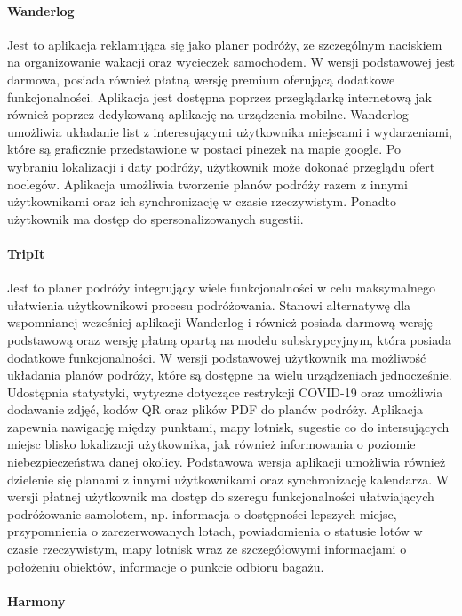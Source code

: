 \paragraph{Wanderlog}

Jest to aplikacja reklamująca się jako planer podróży, ze szczególnym naciskiem na organizowanie wakacji oraz wycieczek samochodem.
W wersji podstawowej jest darmowa, posiada również płatną wersję premium  oferującą dodatkowe funkcjonalności.
Aplikacja jest dostępna poprzez przeglądarkę internetową jak również poprzez dedykowaną aplikację na urządzenia mobilne.
Wanderlog umożliwia układanie list z interesującymi użytkownika miejscami i wydarzeniami, które są graficznie przedstawione w
postaci pinezek na mapie google. Po wybraniu lokalizacji i daty podróży, użytkownik może dokonać przeglądu ofert noclegów.
Aplikacja umożliwia tworzenie planów podróży razem z innymi użytkownikami oraz ich synchronizację w czasie rzeczywistym.
Ponadto użytkownik ma dostęp do spersonalizowanych sugestii.

\paragraph{TripIt}

Jest to planer podróży integrujący wiele funkcjonalności w celu maksymalnego ułatwienia użytkownikowi procesu podróżowania.
Stanowi alternatywę dla wspomnianej wcześniej aplikacji Wanderlog i również posiada darmową wersję podstawową oraz wersję płatną
opartą na modelu subskrypcyjnym, która posiada dodatkowe funkcjonalności. W wersji podstawowej użytkownik ma możliwość układania
planów podróży, które są dostępne na wielu urządzeniach jednocześnie. Udostępnia statystyki, wytyczne dotyczące restrykcji COVID-19
oraz umożliwia dodawanie zdjęć, kodów QR oraz plików PDF do planów podróży. Aplikacja zapewnia nawigację między punktami,
mapy lotnisk, sugestie co do intersujących miejsc blisko lokalizacji użytkownika,
jak również informowania o poziomie niebezpieczeństwa danej okolicy.
Podstawowa wersja aplikacji umożliwia również dzielenie się planami z innymi użytkownikami oraz synchronizację kalendarza.
W wersji płatnej użytkownik ma dostęp do szeregu funkcjonalności ułatwiających podróżowanie samolotem, np. informacja o dostępności
lepszych miejsc, przypomnienia o zarezerwowanych lotach, powiadomienia o statusie lotów w czasie rzeczywistym, mapy lotnisk wraz
ze szczegółowymi informacjami o położeniu obiektów, informacje o punkcie odbioru bagażu.

\paragraph{Harmony}

